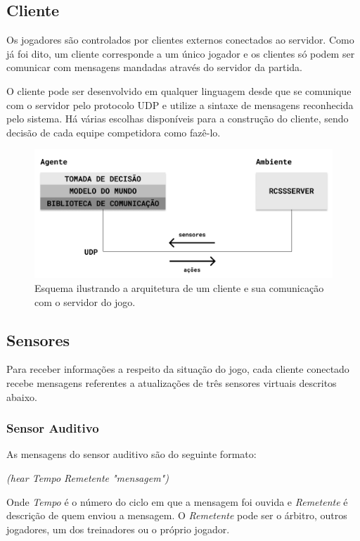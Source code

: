 \subsection{Cliente}
\par Os jogadores são controlados por clientes externos conectados ao servidor. Como já foi dito, um cliente corresponde a um único jogador e os clientes só podem ser comunicar com mensagens mandadas através do servidor da partida.
\par O cliente pode ser desenvolvido em qualquer linguagem desde que se comunique com o servidor pelo protocolo UDP e utilize a sintaxe de mensagens reconhecida pelo sistema. Há várias escolhas disponíveis para a construção do cliente, sendo decisão de cada equipe competidora como fazê-lo.

\begin{figure}[H]
	\includegraphics[width=0.9\linewidth]{figs/system.png}
	\centering
	\caption{Esquema ilustrando a arquitetura de um cliente e sua comunicação com o servidor do jogo.}
	\label{fig:system}
\end{figure}

\subsection{Sensores}

Para receber informações a respeito da situação do jogo, cada cliente conectado recebe mensagens referentes a atualizações de três sensores virtuais descritos abaixo.

\subsubsection{Sensor Auditivo}

As mensagens do sensor auditivo são do seguinte formato:

\textit{(hear Tempo Remetente "mensagem")}

Onde \textit{Tempo} é o número do ciclo em que a mensagem foi ouvida e \textit{Remetente} é descrição de quem enviou a mensagem. O \textit{Remetente} pode ser o árbitro, outros jogadores, um dos treinadores ou o próprio jogador.

